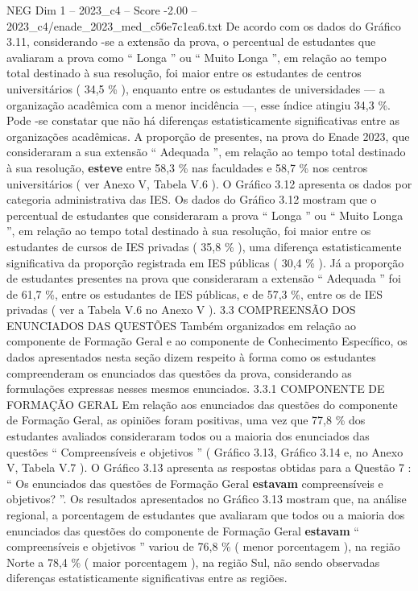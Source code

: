 \begin{textsample}{NEG Dim 1 – 2023\_c4 – Score -2.00 – 2023\_c4/enade\_2023\_med\_c56e7c1ea6.txt}
De acordo com os dados do Gráfico 3.11, considerando -se a extensão da prova, o percentual de estudantes que avaliaram a prova como “ Longa ” ou “ Muito Longa ”, em relação ao tempo total destinado à sua resolução, foi maior entre os estudantes de centros universitários ( 34,5 \% ), enquanto entre os estudantes de universidades — a organização acadêmica com a menor incidência —, esse índice atingiu 34,3 \%.
Pode -se constatar que não há diferenças estatisticamente significativas entre as organizações acadêmicas.
A proporção de presentes, na prova do Enade 2023, que consideraram a sua extensão “ Adequada ”, em relação ao tempo total destinado à sua resolução, \textbf{esteve} entre 58,3 \% nas faculdades e 58,7 \% nos centros universitários ( ver Anexo V, Tabela V.6 ).
O Gráfico 3.12 apresenta os dados por categoria administrativa das IES.
Os dados do Gráfico 3.12 mostram que o percentual de estudantes que consideraram a prova “ Longa ” ou “ Muito Longa ”, em relação ao tempo total destinado à sua resolução, foi maior entre os estudantes de cursos de IES privadas ( 35,8 \% ), uma diferença estatisticamente significativa da proporção registrada em IES públicas ( 30,4 \% ).
Já a proporção de estudantes presentes na prova que consideraram a extensão “ Adequada ” foi de 61,7 \%, entre os estudantes de IES públicas, e de 57,3 \%, entre os de IES privadas ( ver a Tabela V.6 no Anexo V ). 3.3 COMPREENSÃO DOS ENUNCIADOS DAS QUESTÕES Também organizados em relação ao componente de Formação Geral e ao componente de Conhecimento Específico, os dados apresentados nesta seção dizem respeito à forma como os estudantes compreenderam os enunciados das questões da prova, considerando as formulações expressas nesses mesmos enunciados. 3.3.1 COMPONENTE DE FORMAÇÃO GERAL Em relação aos enunciados das questões do componente de Formação Geral, as opiniões foram positivas, uma vez que 77,8 \% dos estudantes avaliados consideraram todos ou a maioria dos enunciados das questões “ Compreensíveis e objetivos ” ( Gráfico 3.13, Gráfico 3.14 e, no Anexo V, Tabela V.7 ).
O Gráfico 3.13 apresenta as respostas obtidas para a Questão 7 : “ Os enunciados das questões de Formação Geral \textbf{estavam} compreensíveis e objetivos? ”.
Os resultados apresentados no Gráfico 3.13 mostram que, na análise regional, a porcentagem de estudantes que avaliaram que todos ou a maioria dos enunciados das questões do componente de Formação Geral \textbf{estavam} “ compreensíveis e objetivos ” variou de 76,8 \% ( menor porcentagem ), na região Norte a 78,4 \% ( maior porcentagem ), na região Sul, não sendo observadas diferenças estatisticamente significativas entre as regiões.

\end{textsample}
